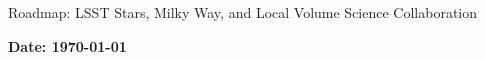 \documentclass[12pt]{article}
\begin{document}
\begin{center}
\huge
Roadmap: \linebreak
LSST Stars, Milky Way, and Local Volume Science Collaboration
\linebreak
\normalsize

{\bf Date: \today}
\linebreak
\end{center}

\pagebreak











\begingroup
    \setlength{\bibsep}{0pt}
    
\endgroup




\end{document}
